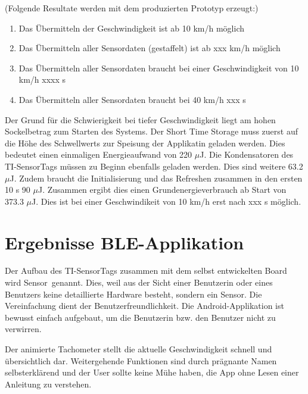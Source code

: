 (Folgende Resultate werden mit dem produzierten Prototyp erzeugt:)


\begin{minipage}{\textwidth}
    \begin{enumerate}
    \item Das Übermitteln der Geschwindigkeit ist ab 10 km/h möglich
    \item Das Übermitteln aller Sensordaten (gestaffelt) ist ab xxx km/h möglich
    \item Das Übermitteln aller Sensordaten braucht bei einer Geschwindigkeit von 10 km/h xxxx s
    \item Das Übermitteln aller Sensordaten braucht bei 40 km/h xxx s
    \end{enumerate}
\end{minipage}


Der Grund für die Schwierigkeit bei tiefer Geschwindigkeit liegt am hohen Sockelbetrag zum Starten des Systems. Der Short Time Storage muss zuerst auf die Höhe des Schwellwerts zur Speisung der Applikatin geladen werden. Dies bedeutet einen einmaligen Energieaufwand von 220 $\mu$J. Die Kondensatoren des TI-SensorTags müssen zu Beginn ebenfalls geladen werden. Dies sind weitere 63.2 $\mu$J. Zudem braucht die Initialisierung und das Refreshen zusammen in den ersten 10 s 90 $\mu$J. Zusammen ergibt dies einen Grundenergieverbrauch ab Start von 373.3 $\mu$J. Dies ist bei einer Geschwindikeit von 10 km/h erst nach xxx s möglich.




\section{Ergebnisse BLE-Applikation}

Der Aufbau des TI-SensorTags zusammen mit dem selbst entwickelten Board wird \glqq Sensor\grqq\thinspace\ genannt. Dies, weil aus der Sicht einer Benutzerin oder eines Benutzers keine detaillierte Hardware besteht, sondern \glqq ein Sensor\grqq. Die Vereinfachung dient der Benutzerfreundlichkeit. Die Android-Applikation ist bewusst einfach aufgebaut, um die Benutzerin bzw. den Benutzer nicht zu verwirren. 

Der animierte Tachometer stellt die aktuelle Geschwindigkeit schnell und übersichtlich dar. Weitergehende Funktionen sind durch prägnante Namen selbsterklärend und der User sollte keine Mühe haben, die App ohne Lesen einer Anleitung zu verstehen.


